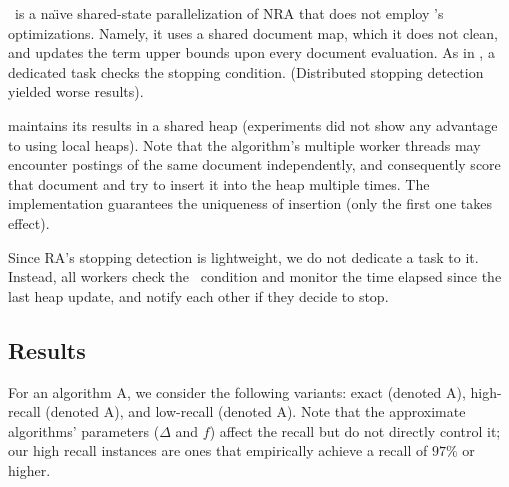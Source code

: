 {\pNRA\ is a na\"{\i}ve shared-state parallelization of NRA that does not employ \alg's optimizations. 
Namely, it uses a shared document map, which it does not clean, and updates the term
upper bounds upon every document evaluation. As in \alg, a dedicated task checks the stopping condition.
(Distributed stopping detection yielded worse results).


{\pRA} maintains its results in a shared heap (experiments did not show any advantage to using local heaps).
Note that the algorithm's multiple worker threads may encounter postings of the same document independently, 
and consequently score that document and try to insert it into the heap multiple times. The implementation guarantees 
the uniqueness of insertion (only the first one takes effect).

Since RA's stopping detection is lightweight, we do not dedicate a task to it. Instead, all workers check the  
\RAStop\ condition and monitor the time elapsed since the last heap update, and notify each other if they 
decide to stop.



\subsection{Results}
\label{ssec:results}

For an algorithm A, we consider the following variants: exact (denoted A\ex), high-recall (denoted A\hi), and
low-recall (denoted A\lo). Note that the approximate algorithms' parameters ($\Delta$ and $f$) affect the recall
but do not directly control it; our high recall instances are ones that empirically achieve a  recall of $97\%$ or 
higher.



}
